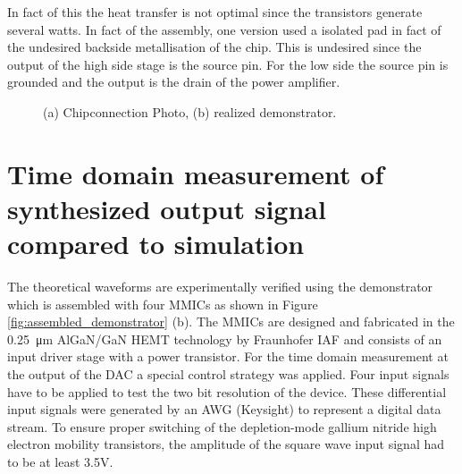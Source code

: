 \documentclass[journal]{IEEEtran}
\begin{document}
In fact of this the heat transfer is not optimal since the transistors generate several watts.
In fact of the assembly, one version used a isolated pad in fact of the undesired backside metallisation of the chip.
This is undesired since the output of the high side stage is the source pin.
For the low side the source pin is grounded and the output is the drain of the power amplifier.

\begin{figure}[htb]
  \centering
	\begin{scriptsize}
  	\def\svgwidth{\columnwidth}
 	 
  	\caption{(a) Chipconnection Photo, (b) realized demonstrator.}
  	\label{fig:photo_chipconnection_demonstrator}
	\end{scriptsize}
\end{figure}






\section{Time domain measurement of synthesized output signal compared to simulation}
\label{sec:experiment}

The theoretical waveforms are experimentally verified using the demonstrator which is assembled with four MMICs as shown in Figure \ref{fig:assembled_demonstrator} (b). 
The MMICs are designed and fabricated in the \SI{0.25}{\micro\meter} AlGaN/GaN HEMT technology by Fraunhofer IAF and consists of an input driver stage with a power transistor.
For the time domain measurement at the output of the DAC a special control strategy was applied.
Four input signals have to be applied to test the two bit resolution of the device. These differential input signals were generated by an AWG (Keysight) to represent a digital data stream. 
To ensure proper switching of the depletion-mode gallium nitride high electron mobility transistors, the amplitude of the square wave input signal had to be at least 3.5V.\\
\end{document}
